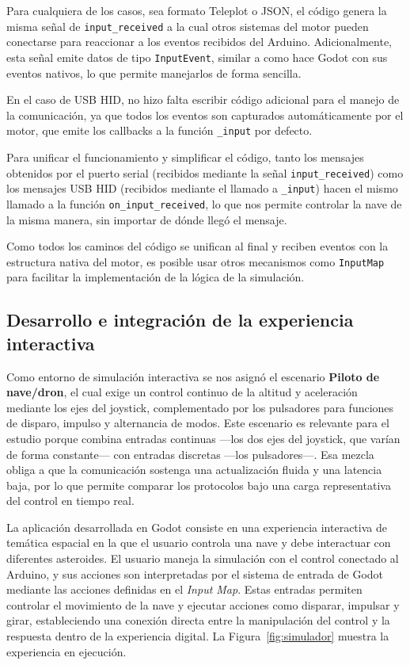 \documentclass[journal]{IEEEtran}
\begin{document}
Para cualquiera de los casos, sea formato Teleplot o JSON, el código genera la misma señal de \texttt{input\_received} a la cual otros sistemas del motor pueden conectarse para reaccionar a los eventos recibidos del Arduino. Adicionalmente, esta señal emite datos de tipo \texttt{InputEvent}, similar a como hace Godot con sus eventos nativos, lo que permite manejarlos de forma sencilla.

En el caso de USB HID, no hizo falta escribir código adicional para el manejo de la comunicación, ya que todos los eventos son capturados automáticamente por el motor, que emite los callbacks a la función \texttt{\_input} por defecto.

Para unificar el funcionamiento y simplificar el código, tanto los mensajes obtenidos por el puerto serial (recibidos mediante la señal \texttt{input\_received}) como los mensajes USB HID (recibidos mediante el llamado a \texttt{\_input}) hacen el mismo llamado a la función \texttt{on\_input\_received}, lo que nos permite controlar la nave de la misma manera, sin importar de dónde llegó el mensaje.

Como todos los caminos del código se unifican al final y reciben eventos con la estructura nativa del motor, es posible usar otros mecanismos como \texttt{InputMap} para facilitar la implementación de la lógica de la simulación.


\subsection{Desarrollo e integración de la experiencia interactiva}



Como entorno de simulación interactiva se nos asignó el escenario \textbf{Piloto de nave/dron}, el cual exige un control continuo de la altitud y aceleración mediante los ejes del joystick, complementado por los pulsadores para funciones de disparo, impulso y alternancia de modos. Este escenario es relevante para el estudio porque combina entradas continuas ---los dos ejes del joystick, que varían de forma constante--- con entradas discretas ---los pulsadores---. Esa mezcla obliga a que la comunicación sostenga una actualización fluida y una latencia baja, por lo que permite comparar los protocolos bajo una carga representativa del control en tiempo real. 


La aplicación desarrollada en Godot consiste en una experiencia interactiva de temática espacial en la que el usuario controla una nave y debe interactuar con diferentes asteroides. El usuario maneja la simulación con el control conectado al Arduino, y sus acciones son interpretadas por el sistema de entrada de Godot mediante las acciones definidas en el \textit{Input Map}. Estas entradas permiten controlar el movimiento de la nave y ejecutar acciones como disparar, impulsar y girar, estableciendo una conexión directa entre la manipulación del control y la respuesta dentro de la experiencia digital. La Figura~\ref{fig:simulador} muestra la experiencia en ejecución.
\end{document}
